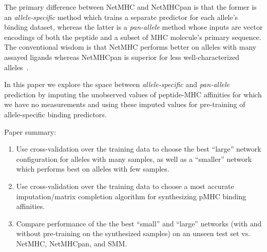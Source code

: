The primary difference between NetMHC and NetMHCpan is that the former is an {\it allele-specific} method which trains a separate predictor for each allele's binding dataset, whereas the latter is a {\it pan-allele} method whose inputs are vector encodings of both the peptide and a subset of MHC molecule's primary sequence. The conventional wisdom is that NetMHC performs better on alleles with many assayed ligands whereas NetMHCpan is superior for less well-characterized alleles~\cite{Gfeller_2016}.

In this paper we explore the space between {\it allele-specific} and {\it pan-allele} prediction by imputing the unobserved values of peptide-MHC affinities for which we have no measurements and using these imputed values for pre-training of allele-specific binding predictors.

Paper summary:
\begin{enumerate}
\item Use cross-validation over the training data to choose the best ``large'' network configuration for alleles with many samples, as well as a ``smaller'' network which performs best on alleles with few samples.
\item Use cross-validation over the training data to choose a most accurate imputation/matrix completion algorithm for 
synthesizing pMHC binding affinities.
\item Compare performance of the the best ``small'' and ``large'' networks (with and without pre-training on the synthesized samples) on an unseen test set vs. NetMHC, NetMHCpan, and SMM. 
\end{enumerate}